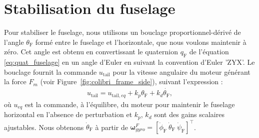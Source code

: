 \section{Stabilisation du fuselage}
\label{sec:stabfus}
Pour stabiliser le fuselage, nous utilisons un bouclage proportionnel-dérivé de l'angle $\theta_{\text{F}}$ formé entre le fuselage et l'horizontale, que nous voulons maintenir à zéro. Cet angle est obtenu en convertissant le quaternion $q_{\text{F}}$ de l'équation \eqref{eq:quat_fuselage} en un angle d'Euler en suivant la convention d'Euler 'ZYX'. Le bouclage fournit la commande $u_{\text{tail}}$ pour la vitesse angulaire du moteur générant la force $F_{m}$ (voir Figure~\ref{fig:colibri_frame_side}), suivant l'expression :
\begin{align}
    \label{eq:pidfus}
    u_{\text{tail}} = u_{\text{tail},eq} + k_{p} \theta_{\text{F}} + k_{d} \dot{\theta_{\text{F}}},
\end{align}
où $u_{eq}$ est la commande, à l'équilibre, du moteur pour maintenir le fuselage horizontal en l'absence de perturbation et $k_{p}$, $k_{d}$ sont des gains scalaires ajustables. Nous obtenons $\dot{\theta}_{\text{F}}$ à partir de $\boldsymbol{\omega}_{gyro}^{F} = [\dot{\phi}_{\text{F}}~\dot{\theta}_{\text{F}}~\dot{\psi}_{\text{F}}]^\top$.

